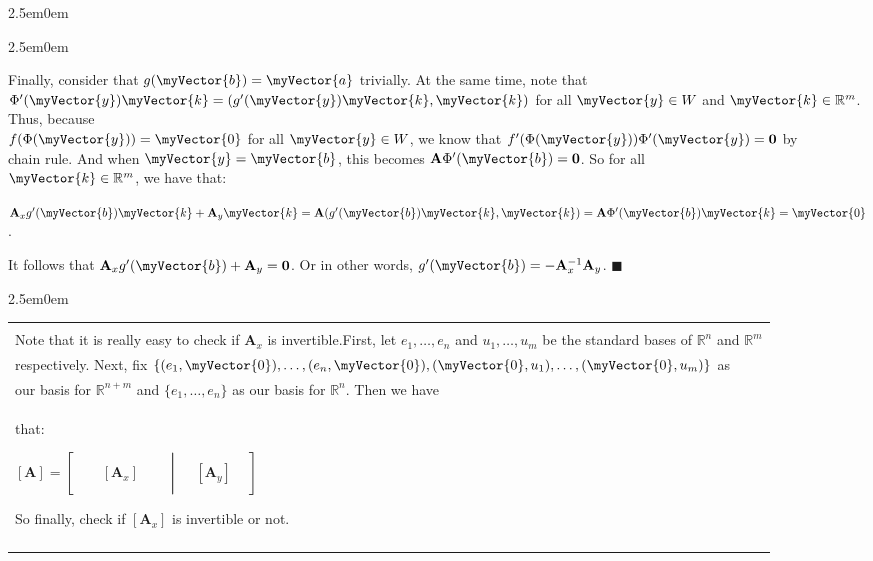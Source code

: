 \documentclass{book}
\newcommand{\teachComment}{
   \color{Orange}%
   \fontsize{12}{14}\selectfont%
}
\newenvironment{myIndent}{%
   \begin{adjustwidth}{2.5em}{0em}%
}{%
   \end{adjustwidth}%
}
\newenvironment{myClosureOne}[2][.]{%
   \color{#1}%
   \begin{tabular}{|p{#2in}|} \hline \\%
}{%
   \\ \hline \end{tabular}%
}
\newcommand{\retTwo}{\hfill\bigbreak}
\newcommand{\mVec}[1]{\myVector{#1}}
\newcommand{\mMat}[1]{\mathbf{#1}}
\begin{document}
{\begin{myIndent}
{\begin{myIndent}
      Finally, consider that $g(\mVec{b}) = \mVec{a}$ trivially. At the same time, note that\\ $\Phi^\prime(\mVec{y})\mVec{k} = (g^\prime(\mVec{y})\mVec{k}, \mVec{k})$ for all $\mVec{y} \in W$ and $\mVec{k} \in \mathbb{R}^m$. Thus, because\\ $f(\Phi(\mVec{y})) = \mVec{0}$ for all $\mVec{y} \in W$, we know that $f^\prime(\Phi(\mVec{y}))\Phi^\prime(\mVec{y}) = \mMat{0}$ by\\ chain rule. And when $\mVec{y} = \mVec{b}$, this becomes $\mMat{A}\Phi^\prime(\mVec{b}) = \mMat{0}$. So for all\\ $\mVec{k} \in \mathbb{R}^m$, we have that:
      
      {\centering $\mMat{A}_xg^\prime(\mVec{b})\mVec{k} + \mMat{A}_y\mVec{k} = \mMat{A}(g^\prime(\mVec{b})\mVec{k}, \mVec{k}) = \mMat{A}\Phi^\prime(\mVec{b})\mVec{k} = \mVec{0}$.\retTwo\par}

      It follows that $\mMat{A}_xg^\prime(\mVec{b}) + \mMat{A}_y = \mMat{0}$. Or in other words, $g^\prime(\mVec{b}) = -\mMat{A}_x^{-1}\mMat{A}_y$. $\blacksquare$\retTwo\retTwo
   \end{myIndent}}

   {\begin{myIndent}\teachComment
      \begin{myClosureOne}{4.9}
         Note that it is really easy to check if $\mMat{A}_x$ is invertible.\retTwo First, let $e_1, \ldots, e_n$ and $u_1, \ldots, u_m$ be the standard bases of $\mathbb{R}^n$ and $\mathbb{R}^m$\\ respectively. Next, fix $\{(e_1, \mVec{0}), \ldots, (e_n, \mVec{0}), (\mVec{0}, u_1), \ldots, (\mVec{0}, u_m)\}$ as\\ our basis for $\mathbb{R}^{n + m}$ and $\{e_1, \ldots, e_n\}$ as our basis for $\mathbb{R}^n$. Then we have\\ that:
   
         {\center $ [\mMat{A}] = 
         \left[\begin{matrix}
            & & & & \\ & & [\mMat{A}_x] & & \\ & & & &
         \end{matrix}\middle|\begin{matrix}
            & & \\ &[\mMat{A}_y]& \\ & &
         \end{matrix}\right]$ \retTwo\par}
   
         So finally, check if $[\mMat{A}_x]$ is invertible or not.\\ [-4pt]
      \end{myClosureOne}\retTwo\retTwo
   \end{myIndent}}
\end{myIndent}}
\end{document}
